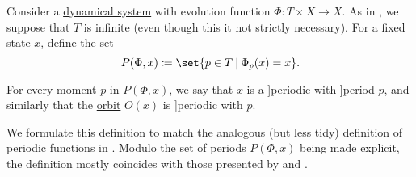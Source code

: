 \begin{definition}\label{def:dynamical_system_periodicity}\mimprovised
  Consider a \hyperref[def:dynamical_system]{dynamical system} with evolution function \( \Phi: T \times X \to X \). As in , we suppose that \( T \) is infinite (even though this it not strictly necessary). For a fixed state \( x \), define the set
  \begin{equation*}
    P(\Phi, x) \coloneqq \set{ p \in T \given \Phi_p(x) = x }.
  \end{equation*}

  For every  moment \( p \) in \( P(\Phi, x) \), we say that \( x \) is a \term[en=periodic (point) (\incite[def. 11(iii)]{GiuntiMazzola2012DynamicalSystemsOnMonoids}]{periodic} with \term[en=period (\incite[def. 11(ii)]{GiuntiMazzola2012DynamicalSystemsOnMonoids}]{period} \( p \), and similarly that the \hyperref[def:dynamical_system_trajectory]{orbit} \( O(x) \) is \term[en=periodic (orbit) (\incite[def. 12(i)]{GiuntiMazzola2012DynamicalSystemsOnMonoids}]{periodic} with  \( p \).
\end{definition}
\begin{comments}
  \item We formulate this definition to match the analogous (but less tidy) definition of periodic functions in . Modulo the set of periods \( P(\Phi, x) \) being made explicit, the definition mostly coincides with those presented by  and .
\end{comments}

